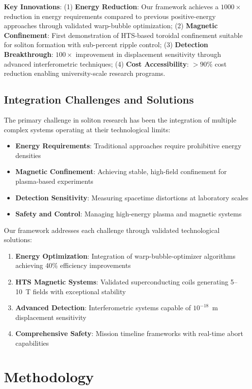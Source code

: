 \documentclass[12pt,a4paper]{article}
\begin{document}
\textbf{Key Innovations}: (1) \textbf{Energy Reduction}: Our framework achieves a $1000 \times$ reduction in energy requirements compared to previous positive-energy approaches through validated warp-bubble optimization; (2) \textbf{Magnetic Confinement}: First demonstration of HTS-based toroidal confinement suitable for soliton formation with sub-percent ripple control; (3) \textbf{Detection Breakthrough}: $100 \times$ improvement in displacement sensitivity through advanced interferometric techniques; (4) \textbf{Cost Accessibility}: $>90\%$ cost reduction enabling university-scale research programs.

\subsection{Integration Challenges and Solutions}

The primary challenge in soliton research has been the integration of multiple complex systems operating at their technological limits:
\begin{itemize}
\item \textbf{Energy Requirements}: Traditional approaches require prohibitive energy densities
\item \textbf{Magnetic Confinement}: Achieving stable, high-field confinement for plasma-based experiments
\item \textbf{Detection Sensitivity}: Measuring spacetime distortions at laboratory scales
\item \textbf{Safety and Control}: Managing high-energy plasma and magnetic systems
\end{itemize}

Our framework addresses each challenge through validated technological solutions:
\begin{enumerate}
\item \textbf{Energy Optimization}: Integration of warp-bubble-optimizer algorithms achieving 40\% efficiency improvements
\item \textbf{HTS Magnetic Systems}: Validated superconducting coils generating 5--10~T fields with exceptional stability
\item \textbf{Advanced Detection}: Interferometric systems capable of $10^{-18}$~m displacement sensitivity
\item \textbf{Comprehensive Safety}: Mission timeline frameworks with real-time abort capabilities
\end{enumerate}

\section{Methodology}
\end{document}
